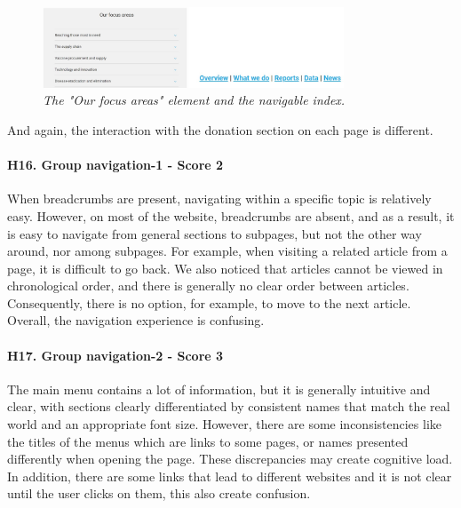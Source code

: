 \begin{figure}[!h]
	\begin{center}
		\includegraphics[width=0.8\textwidth]{FinalScores19.jpg}
		\captionsetup{font=small}
		\caption{\textit{The "Our focus areas" element and the navigable index.}}
	\end{center}
\end{figure}
\newline And again, the interaction with the donation section on each page is different.
\newline
\newline \paragraph{H16. Group navigation-1 - Score 2}  \label{subsec:H16}	When breadcrumbs are present, navigating within a specific topic is relatively easy. However, on most of the website, breadcrumbs are absent, and as a result, it is easy to navigate from general sections to subpages, but not the other way around, nor among subpages. For example, when visiting a related article from a page, it is difficult to go back.
\newline We also noticed that articles cannot be viewed in chronological order, and there is generally no clear order between articles. Consequently, there is no option, for example, to move to the next article.
\newline Overall, the navigation experience is confusing.
\newline
\newline \paragraph{H17. Group navigation-2 - Score 3}  \label{subsec:H17}	The main menu contains a lot of information, but it is generally intuitive and clear, with sections clearly differentiated by consistent names that match the real world and an appropriate font size. However, there are some inconsistencies like the titles of the menus which are links to some pages, or names presented differently when opening the page. These discrepancies may create cognitive load. 
\newline In addition, there are some links that lead to different websites and it is not clear until the user clicks on them, this also create confusion.
